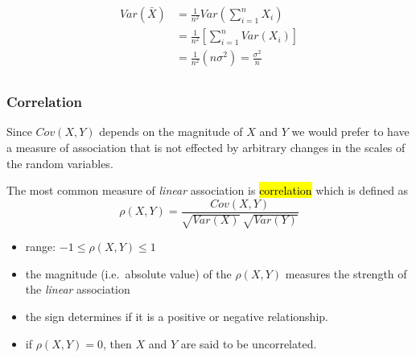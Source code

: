 \documentclass[slidestop,compress,mathserif]{beamer}
\begin{document}
\begin{frame}%




\pause
\begin{align*}
Var(\bar{X}) & = \frac{1}{n^2} Var\left( \sum_{i = 1}^n X_i \right) \\
& = \frac{1}{n^2} \left[ \sum_{i = 1}^n Var(X_i) \right] \\
& = \frac{1}{n^2} \left( n \sigma^2 \right) = \frac{\sigma^2}{n}\\
\end{align*}






\end{frame}


\begin{frame}
\frametitle{Correlation}

Since $Cov(X,Y)$ depends on the magnitude of $X$ and $Y$ we would prefer to have a measure of association that is not effected by arbitrary changes in the scales of the random variables.\\

\begin{defn}
The most common measure of \emph{linear} association is \hl{correlation} which is defined as
\[ \rho(X,Y) = \frac{Cov(X,Y)}{\sqrt{Var(X)}~\sqrt{Var(Y)}}  \]
\end{defn}

\begin{itemize}
\item range: $-1 \leq \rho(X,Y) \leq 1 $
\item the magnitude (i.e.\ absolute value) of the $\rho(X,Y)$ measures the strength of the \emph{linear} association
\item the sign determines if it is a positive or negative relationship.
\item if $\rho(X, Y) = 0$, then $X$ and $Y$ are said to be uncorrelated.
\end{itemize}
\end{frame}



\end{document}
